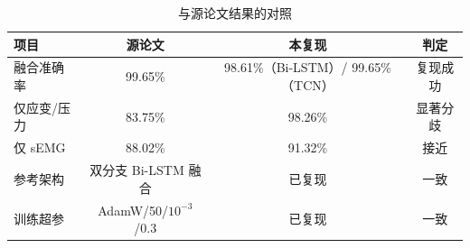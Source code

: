\begin{table}[htbp]\centering
\caption{与源论文结果的对照}
\label{tab:paper}
\begin{tabular}{lccc}
\toprule
项目 & 源论文 & 本复现 & 判定 \\
\midrule
融合准确率 & 99.65\% & 98.61\%（Bi-LSTM）/ 99.65\%（TCN） & 复现成功 \\
仅应变/压力 & 83.75\% & 98.26\% & 显著分歧 \\
仅 sEMG & 88.02\% & 91.32\% & 接近 \\
参考架构 & 双分支 Bi-LSTM 融合 & 已复现 & 一致 \\
训练超参 & AdamW/50/$10^{-3}$/0.3 & 已复现 & 一致 \\
\bottomrule
\end{tabular}
\end{table}
